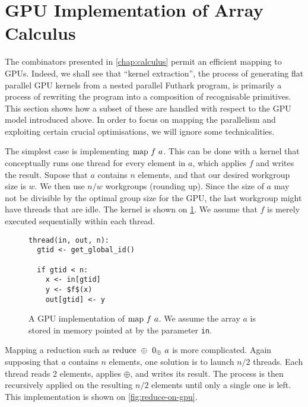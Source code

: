 \section{GPU Implementation of Array Calculus}
\label{sec:calculus-implementation}

The combinators presented in \cref{chap:calculus} permit an efficient
mapping to GPUs.  Indeed, we shall see that ``kernel extraction'', the
process of generating flat parallel GPU kernels from a nested parallel
Futhark program, is primarily a process of rewriting the program into
a composition of recognisable primitives.  This section shows how a
subset of these are handled with respect to the GPU model introduced
above.  In order to focus on mapping the parallelism and exploiting
certain crucial optimisations, we will ignore some technicalities.

The simplest case is implementing $\mathrm{map}~f~a$.  This can be done with
a kernel that conceptually runs one thread for every element in $a$,
which applies $f$ and writes the result.  Supose that $a$ contains $n$
elements, and that our desired workgroup size is $w$.  We then use
$n/w$ workgroups (rounding up).  Since the size of $a$ may not be
divisible by the optimal group size for the GPU, the last workgroup
might have threads that are idle.  The kernel is shown on
\cref{fig:map-on-gpu}.  We assume that $f$ is merely executed
sequentially within each thread.

\begin{figure}

\begin{lstlisting}[language={},mathescape]
thread(in, out, n):
  gtid <- get_global_id()

  if gtid < n:
    x <- in[gtid]
    y <- $f$(x)
    out[gtid] <- y
\end{lstlisting}

  \caption{A GPU implementation of $\mathrm{map}~f~a$.  We assume the array
    $a$ is stored in memory pointed at by the parameter \texttt{in}.}
  \label{fig:map-on-gpu}
\end{figure}

Mapping a reduction such as $\mathrm{reduce}~\oplus~0_{\oplus}~a$ is more
complicated.  Again supposing that $a$ contains $n$ elements, one
solution is to launch $n/2$ threads.  Each thread reads 2 elements,
applies $\oplus$, and writes its result.  The process is then
recursively applied on the resulting $n/2$ elements until only a
single one is left.  This implementation is shown on
\cref{fig:reduce-on-gpu}.

